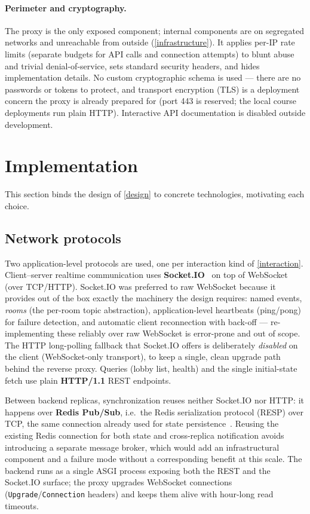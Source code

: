 \documentclass{scrartcl}
\begin{document}
\paragraph{Perimeter and cryptography.}
The proxy is the only exposed component; internal components are on segregated
networks and unreachable from outside (\cref{infrastructure}). It applies per-IP
rate limits (separate budgets for API calls and connection attempts) to blunt
abuse and trivial denial-of-service, sets standard security headers, and hides
implementation details. No custom cryptographic schema is used --- there are no
passwords or tokens to protect, and transport encryption (TLS) is a deployment
concern the proxy is already prepared for (port 443 is reserved; the local course
deployments run plain HTTP). Interactive API documentation is disabled outside
development.

\section{Implementation}\label{implementation}

This section binds the design of \cref{design} to concrete technologies,
motivating each choice.

\subsection{Network protocols}\label{network-protocols}

Two application-level protocols are used, one per interaction kind of
\cref{interaction}. Client--server realtime communication uses
\textbf{Socket.IO}~\cite{socketio} on top of WebSocket (over TCP/HTTP).
Socket.IO was preferred to raw WebSocket because it provides out of the box
exactly the machinery the design requires: named events, \emph{rooms} (the
per-room topic abstraction), application-level heartbeats (ping/pong) for
failure detection, and automatic client reconnection with back-off ---
re-implementing these reliably over raw WebSocket is error-prone and out of
scope. The HTTP long-polling fallback that Socket.IO offers is deliberately
\emph{disabled} on the client (WebSocket-only transport), to keep a single,
clean upgrade path behind the reverse proxy. Queries (lobby list, health) and
the single initial-state fetch use plain \textbf{HTTP/1.1} REST endpoints.

Between backend replicas, synchronization reuses neither Socket.IO nor HTTP: it
happens over \textbf{Redis Pub/Sub}, i.e.\ the Redis serialization protocol
(RESP) over TCP, the same connection already used for state
persistence~\cite{redis}. Reusing the existing Redis connection for both state
and cross-replica notification avoids introducing a separate message broker,
which would add an infrastructural component and a failure mode without a
corresponding benefit at this scale. The backend runs as a single ASGI process
exposing both the REST and the Socket.IO surface; the proxy upgrades WebSocket
connections (\texttt{Upgrade}/\texttt{Connection} headers) and keeps them alive
with hour-long read timeouts.
\end{document}

